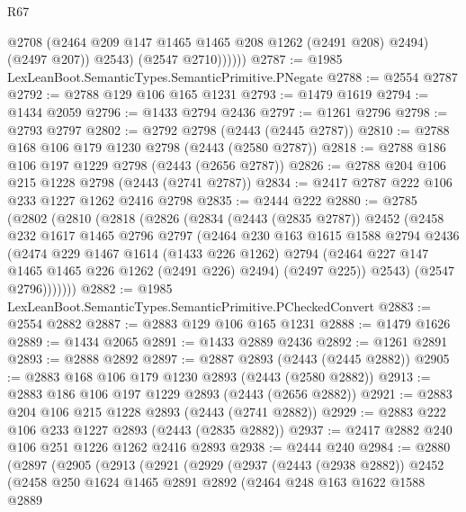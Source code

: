 \begin{lexlean}{R67}
\begin{coremodule}
                  @2708
                  (@2464 @209 @147 @1465 @1465 @208 @1262 (@2491 @208) @2494)
                  (@2497 @207))
                @2543)
              (@2547 @2710))))))
@2787 := @1985 LexLeanBoot.SemanticTypes.SemanticPrimitive.PNegate
@2788 := @2554 @2787
@2792 := @2788 @129 @106 @165 @1231
@2793 := @1479 @1619
@2794 := @1434 @2059
@2796 := @1433 @2794 @2436
@2797 := @1261 @2796
@2798 := @2793 @2797
@2802 := @2792 @2798 (@2443 (@2445 @2787))
@2810 := @2788 @168 @106 @179 @1230 @2798 (@2443 (@2580 @2787))
@2818 := @2788 @186 @106 @197 @1229 @2798 (@2443 (@2656 @2787))
@2826 := @2788 @204 @106 @215 @1228 @2798 (@2443 (@2741 @2787))
@2834 := @2417 @2787 @222 @106 @233 @1227 @1262 @2416 @2798
@2835 := @2444 @222
@2880 := @2785
    (@2802
      (@2810
        (@2818
          (@2826
            (@2834
              (@2443 (@2835 @2787))
              @2452
              (@2458
                @232
                @1617
                @1465
                @2796
                @2797
                (@2464
                  @230
                  @163
                  @1615
                  @1588
                  @2794
                  @2436
                  (@2474
                    @229
                    @1467
                    @1614
                    (@1433 @226 @1262)
                    @2794
                    (@2464 @227 @147 @1465 @1465 @226 @1262 (@2491 @226) @2494)
                    (@2497 @225))
                  @2543)
                (@2547 @2796)))))))
@2882 := @1985 LexLeanBoot.SemanticTypes.SemanticPrimitive.PCheckedConvert
@2883 := @2554 @2882
@2887 := @2883 @129 @106 @165 @1231
@2888 := @1479 @1626
@2889 := @1434 @2065
@2891 := @1433 @2889 @2436
@2892 := @1261 @2891
@2893 := @2888 @2892
@2897 := @2887 @2893 (@2443 (@2445 @2882))
@2905 := @2883 @168 @106 @179 @1230 @2893 (@2443 (@2580 @2882))
@2913 := @2883 @186 @106 @197 @1229 @2893 (@2443 (@2656 @2882))
@2921 := @2883 @204 @106 @215 @1228 @2893 (@2443 (@2741 @2882))
@2929 := @2883 @222 @106 @233 @1227 @2893 (@2443 (@2835 @2882))
@2937 := @2417 @2882 @240 @106 @251 @1226 @1262 @2416 @2893
@2938 := @2444 @240
@2984 := @2880
    (@2897
      (@2905
        (@2913
          (@2921
            (@2929
              (@2937
                (@2443 (@2938 @2882))
                @2452
                (@2458
                  @250
                  @1624
                  @1465
                  @2891
                  @2892
                  (@2464
                    @248
                    @163
                    @1622
                    @1588
                    @2889

\end{coremodule}
\end{lexlean}
